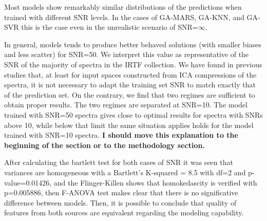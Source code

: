 Most models show remarkably similar distributions of the
predictions when trained with different SNR levels. In the cases of
GA-MARS, GA-KNN, and GA-SVR this is the case even in the unrealistic
scenario of SNR=$\infty$.

In general, models tends to produce better behaved solutions (with
smaller biases and less scatter) for SNR=50. We interpret this value
as representative of the SNR of the majority of spectra in the IRTF
collection. We have found in previous studies that, at least for input
spaces constructed from ICA compressions of the spectra, it is not
necessary to adapt the training set SNR to match exactly that of the
prediction set. On the contrary, we find that two regimes are
sufficient to obtain proper results. The two regimes are separated at
SNR=10. The model trained with SNR=50 spectra gives close to optimal
results for spectra with SNRs above 10, while below that limit the
same situation applies holds for the model trained with SNR=10
spectra. {\bf I should move this explanation to the beginning of the
section or to the methodology section.}


After calculating the bartlett test for both cases of SNR it was 
seen that variances are homogeneous with a Bartlett\textquoteright s K-squared = 8.5 with df=2
and p-value=0.01426, and 
the Flinger-Killen shows that homokedascity is verified with p=0.005886, 
then F-ANOVA test makes clear that there is no significative 
difference between models. Then, it is possible to conclude
that quality of features from both sources are equivalent
regarding the modeling capability.






